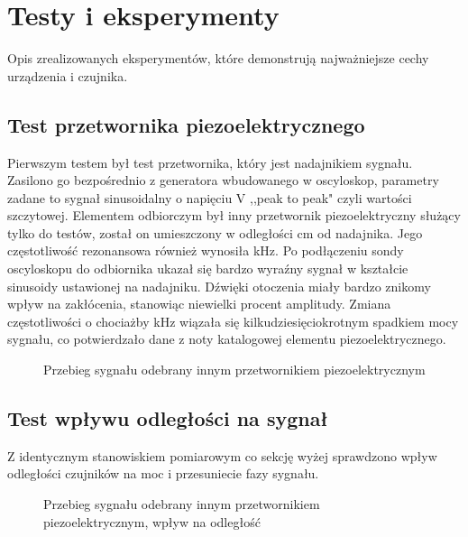 \chapter[Testy i eksperymenty]{Testy i eksperymenty}

\label{chapter:testy}

Opis zrealizowanych eksperymentów, które demonstrują
najważniejsze cechy urządzenia i czujnika.

\section{Test przetwornika piezoelektrycznego}
Pierwszym testem był test przetwornika, który jest nadajnikiem sygnału. Zasilono go bezpośrednio z generatora wbudowanego w oscyloskop, 
parametry zadane to sygnał sinusoidalny o napięciu \unit[5]{V} ,,peak to peak" czyli wartości szczytowej.
Elementem odbiorczym był inny przetwornik piezoelektryczny służący tylko do testów, został on umieszczony w odległości \unit[10]{cm} od nadajnika. 
Jego częstotliwość rezonansowa również wynosiła \unit[40]{kHz}.
Po podłączeniu sondy oscyloskopu do odbiornika ukazał się bardzo wyraźny sygnał w kształcie sinusoidy ustawionej na nadajniku.
Dźwięki otoczenia miały bardzo znikomy wpływ na zakłócenia, stanowiąc niewielki procent amplitudy. 
Zmiana częstotliwości o chociażby \unit[1]{kHz} wiązała się kilkudziesięciokrotnym spadkiem mocy sygnału, co potwierdzało dane z noty katalogowej elementu piezoelektrycznego.
\begin{figure}[!ht]
    \centering
    \caption{Przebieg sygnału odebrany innym przetwornikiem piezoelektrycznym}
    \label{fig:oscylo_piezo}
\end{figure}

\section{Test wpływu odległości na sygnał}
Z identycznym stanowiskiem pomiarowym co sekcję wyżej sprawdzono wpływ odległości czujników na moc i przesuniecie fazy sygnału. 

\begin{figure}[!ht]
    \centering
    \caption{Przebieg sygnału odebrany innym przetwornikiem piezoelektrycznym, wpływ na odległość}
    \label{fig:oscylo_piezo2}
\end{figure}

